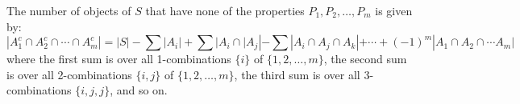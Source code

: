 \begin{thm}
The number of objects of $S$ that have none of the properties $P_{1}, P_{2}, \ldots, P_{m}$ is given by:
\[|A^{c}_{1} \cap A^{c}_{2} \cap \cdots \cap A^{c}_{m}| = |S| - \sum|A_{i}| + \sum|A_{i} \cap |A_{j}| - \sum|A_{i} \cap A_{j} \cap A_{k}| + \cdots + (-1)^{m}|A_{1} \cap A_{2} \cap \cdots A_{m}| \]
where the first sum is over all 1-combinations $\{i\}$ of $\{1,2, \ldots, m \}$, the second sum is over all 2-combinations $\{i,j\}$ of $\{1,2, \ldots, m\}$, the third sum is over all 3-combinations $\{i,j,j\}$, and so on. 
\end{thm}
